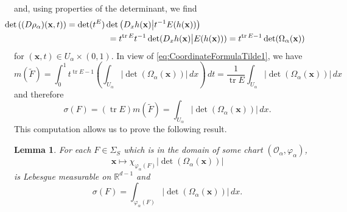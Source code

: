 \documentclass[11pt]{article}
\theoremstyle{theorem}
\newtheorem{lemma}[theorem]{Lemma}
\newcommand\tr{\operatorname{tr}}
\renewcommand\det{\operatorname{det}}
\begin{document}
and, using properties of the determinant, we find
\begin{eqnarray*}
\lefteqn{\hspace{-1cm}\det \left((D\rho_\alpha)(\mathbf{x},t)\right)=\det(t^E)\det\left(D_x h(\mathbf{x})\big\vert t^{-1}E(h(\mathbf{x}))\right)}\\
&&\hspace{3cm}=t^{\tr E}t^{-1}\det (D_xh(\mathbf{x})\big\vert E(h(\mathbf{x})))=t^{\tr E-1}\det (\Omega_\alpha(\mathbf{x}))
\end{eqnarray*}
for $(\mathbf{x},t)\in U_\alpha\times (0,1)$. In view of \eqref{eq:CoordinateFormulaTilde1}, we have
\begin{equation*}
m\left(\widetilde{F}\right)=\int_0^1 t^{\tr E-1}\left(\int_{U_\alpha}|\det(\Omega_\alpha(\mathbf{x}))|\,dx\right)\,dt=\frac{1}{\tr E}\int_{U_\alpha}|\det(\Omega_\alpha(\mathbf{x}))|\,dx
\end{equation*}
and therefore
\begin{equation*}
\sigma(F)=(\tr E)m\left(\widetilde{F}\right)=\int_{U_\alpha}|\det(\Omega_\alpha(\mathbf{x}))|\,dx.
\end{equation*}
This computation allows us to prove the following result.
\begin{lemma}
For each $F\in\Sigma_S$ which is in the domain of some chart $(\mathcal{O}_\alpha,\varphi_\alpha)$, 
\begin{equation*}
\mathbf{x}\mapsto \chi_{\varphi_\alpha(F)}|\det(\Omega_\alpha (\mathbf{x}))|
\end{equation*}
is Lebesgue measurable on $\mathbb{R}^{d-1}$ and
\begin{equation*}
\sigma(F)=\int_{\varphi_\alpha(F)}|\det(\Omega_\alpha (\mathbf{x}))|\,dx.
\end{equation*}
\end{lemma}
\end{document}
